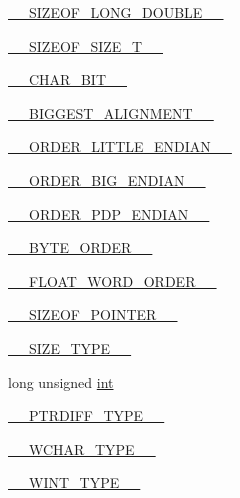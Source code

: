 \begin{DoxyCompactItemize}
\item 
\hyperlink{CMakeCache_8txt_a398170fb1a6ec5ddef97aada19630f92}{\+\_\+\+\_\+\+S\+I\+Z\+E\+O\+F\+\_\+\+L\+O\+N\+G\+\_\+\+D\+O\+U\+B\+L\+E\+\_\+\+\_\+}
\item 
\hyperlink{CMakeCache_8txt_a8a0ccc607658039e8f34c766290b880a}{\+\_\+\+\_\+\+S\+I\+Z\+E\+O\+F\+\_\+\+S\+I\+Z\+E\+\_\+\+T\+\_\+\+\_\+}
\item 
\hyperlink{CMakeCache_8txt_af18faf2347e6868d6c9ed02b46326720}{\+\_\+\+\_\+\+C\+H\+A\+R\+\_\+\+B\+I\+T\+\_\+\+\_\+}
\item 
\hyperlink{CMakeCache_8txt_ade3bae6ac3c6cb0079bc5a1a61316c5a}{\+\_\+\+\_\+\+B\+I\+G\+G\+E\+S\+T\+\_\+\+A\+L\+I\+G\+N\+M\+E\+N\+T\+\_\+\+\_\+}
\item 
\hyperlink{CMakeCache_8txt_a668b60d2f5086a7b075f8d739e3a02d5}{\+\_\+\+\_\+\+O\+R\+D\+E\+R\+\_\+\+L\+I\+T\+T\+L\+E\+\_\+\+E\+N\+D\+I\+A\+N\+\_\+\+\_\+}
\item 
\hyperlink{CMakeCache_8txt_aadebb1c0721f9b0a30fe99e903ab7379}{\+\_\+\+\_\+\+O\+R\+D\+E\+R\+\_\+\+B\+I\+G\+\_\+\+E\+N\+D\+I\+A\+N\+\_\+\+\_\+}
\item 
\hyperlink{CMakeCache_8txt_a1d768fc4923117ddc111812917d014f1}{\+\_\+\+\_\+\+O\+R\+D\+E\+R\+\_\+\+P\+D\+P\+\_\+\+E\+N\+D\+I\+A\+N\+\_\+\+\_\+}
\item 
\hyperlink{CMakeCache_8txt_a06b21194cf5550fb37cc1282001bdc0e}{\+\_\+\+\_\+\+B\+Y\+T\+E\+\_\+\+O\+R\+D\+E\+R\+\_\+\+\_\+}
\item 
\hyperlink{CMakeCache_8txt_af83df19811ef575ae2b34e8c904a0408}{\+\_\+\+\_\+\+F\+L\+O\+A\+T\+\_\+\+W\+O\+R\+D\+\_\+\+O\+R\+D\+E\+R\+\_\+\+\_\+}
\item 
\hyperlink{CMakeCache_8txt_a1ee656ff8807634813d40465fb2bcdc1}{\+\_\+\+\_\+\+S\+I\+Z\+E\+O\+F\+\_\+\+P\+O\+I\+N\+T\+E\+R\+\_\+\+\_\+}
\item 
\hyperlink{CMakeCache_8txt_afad16a5dece04ae3a5d68fc746889cdd}{\+\_\+\+\_\+\+S\+I\+Z\+E\+\_\+\+T\+Y\+P\+E\+\_\+\+\_\+}
\item 
long unsigned \hyperlink{CMakeCache_8txt_a79a3d8790b2588b09777910863574e09}{int}
\item 
\hyperlink{CMakeCache_8txt_a2e569667c74a773d6110a55fb19fe7d7}{\+\_\+\+\_\+\+P\+T\+R\+D\+I\+F\+F\+\_\+\+T\+Y\+P\+E\+\_\+\+\_\+}
\item 
\hyperlink{CMakeCache_8txt_a20f76e5c58ddc0926b85e9093730c9ae}{\+\_\+\+\_\+\+W\+C\+H\+A\+R\+\_\+\+T\+Y\+P\+E\+\_\+\+\_\+}
\item 
\hyperlink{CMakeCache_8txt_ab9eb6de4ef3e35d820fa14bf279673c6}{\+\_\+\+\_\+\+W\+I\+N\+T\+\_\+\+T\+Y\+P\+E\+\_\+\+\_\+}

\end{DoxyCompactItemize}
